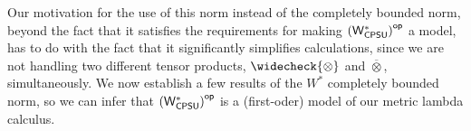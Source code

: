  
Our motivation for the use of this norm instead of the completely bounded norm, beyond the fact that it satisfies the requirements for making \( \left(\mathsf{W^*_{CPSU}}\right)^{\mathsf{op}} \) a model, has to do with the fact that it significantly simplifies calculations, since we are not handling two different tensor products, \( \widecheck{\otimes} \) and \( \overline{\otimes} \), simultaneously. %
 We now establish a few results of the $W^*$ completely bounded norm, so we can infer that $\left(\mathsf{W^*_{CPSU}}\right)^{\mathsf{op}}$ is a (first-oder) model of our metric lambda calculus.



